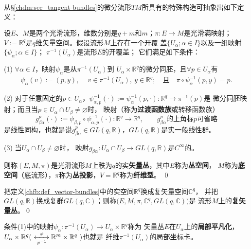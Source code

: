 从\S \ref{chdm:sec_tangent-bundles}的微分流形$TM$所具有的特殊构造可抽象出如下定义：
\begin{definition}\label{chfb:def_vector-bundles}
    设$E$、$M$是两个光滑流形，维数分别是$q+m$和$m$；$\pi:E\to M$是光滑满映射；
    $V := \mathbb{R}^q$是$q$维矢量空间。假设流形$M$上存在一个开覆
    盖$\{U_\alpha; \alpha\in I\}$以及一组映射$\{\psi_\alpha; \alpha\in I\}$；
    $\pi^{-1}(U_\alpha)$是流形$E$的开覆盖；
    它们满足如下条件：

    (1) $\forall \alpha \in I$，映射$\psi_\alpha$是从$\pi^{-1}(U_\alpha)$到
    $U_\alpha \times \mathbb{R}^q$的微分同胚，且$\forall p \in U_\alpha$有
    \begin{align*}
        \psi_\alpha\left(v\right) := \left(p, y \right),
        \quad \ v\in \pi^{-1} (U_\alpha),\ y \in \mathbb{R}^q ;
        \quad \text{且}\quad
        \pi \circ \psi_\alpha^{-1} (p,y) = p.
    \end{align*}

    (2) 对于任意固定的$p\in U_\alpha$，$\psi^{-1}_{\alpha,p}(\cdot) := \psi^{-1}_\alpha(p,\cdot):\mathbb{R}^q\to \pi^{-1}(p)$是
    微分同胚映射；而且当$p\in U_\alpha \cap U_\beta \neq \varnothing$时，
    映射（称为\textbf{过渡函数族}或转移函数族）
    \begin{equation*}
        g^p_{\beta\alpha} (\cdot) := \psi_{\beta,p} \circ \psi^{-1}_{\alpha,p}(\cdot ) : \mathbb{R}^q\to\mathbb{R}^q ,
        \qquad g^p_{\beta\alpha}\text{的上角标$p$可省略}
    \end{equation*}
    是线性同构，也就是说$g^p_{\beta\alpha}\in GL(q,\mathbb{R})$，$GL(q,\mathbb{R})$是{实}一般线性群。

    (3) 当$U_\alpha \cap U_\beta \neq \varnothing$时，
    映射$g_{\beta\alpha}: U_\alpha \cap U_\beta \to GL(q,\mathbb{R})$是$C^\infty$的。

    则称$(E,M,\pi)$是光滑流形$M$上秩为$q$的实\textbf{矢量丛}，其中$E$称为\textbf{丛空间}，
    $M$称为\textbf{底空间}（底流形），$\pi$称为\textbf{丛投影}，$V=\mathbb{R}^q$称为\textbf{纤维型}。
\qed
\end{definition}

\begin{definition}
把定义\ref{chfb:def_vector-bundles}中的实空间$\mathbb{R}^q$换成{复}矢量空间$\mathbb{C}^q$，
并把$GL(q,\mathbb{R})$换成复群$GL(q,\mathbb{C})$；则称$\bigl(E,M,\pi,\mathbb{C}^q,GL(q,\mathbb{C})\bigr)$是
流形$M$上的\textbf{复矢量丛}。\qed
\end{definition}

条件(1)中的映射$\psi_\alpha:\pi^{-1}(U_\alpha) \to U_\alpha \times \mathbb{R}^q$称为
矢量丛$E$在$U_\alpha$上的\textbf{局部平凡化}，
$U_\alpha \times \mathbb{R}^q (\ \xleftrightarrow[\varphi^{-1}]{\varphi}
\mathbb{R}^m \times \mathbb{R}^q\ )$也就是
纤维$\pi^{-1}(U_\alpha)$的局部坐标卡。

